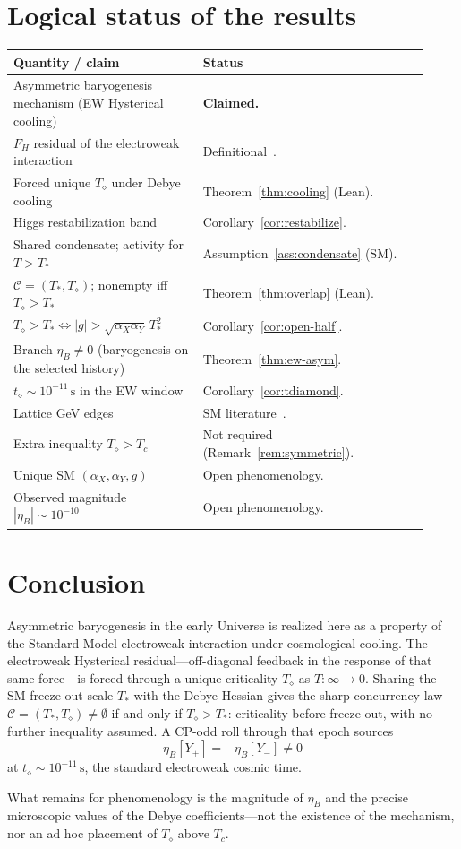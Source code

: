 \documentclass[11pt]{article}
\theoremstyle{definition}
\theoremstyle{remark}
\newcommand{\Td}{T_{\diamond}}
\begin{document}
\section{Logical status of the results}
\label{sec:status}
\begin{center}
\small
\begin{tabular}{@{}p{0.42\linewidth}p{0.50\linewidth}@{}}
\toprule
\textbf{Quantity / claim} & \textbf{Status}\\
\midrule
Asymmetric baryogenesis mechanism (EW Hysterical cooling) & \textbf{Claimed.}\\
$F_H$ residual of the electroweak interaction & Definitional~\cite{boyd2026response}.\\
Forced unique $\Td$ under Debye cooling & Theorem~\ref{thm:cooling} (Lean).\\
Higgs restabilization band & Corollary~\ref{cor:restabilize}.\\
Shared condensate; activity for $T>T_*$ & Assumption~\ref{ass:condensate} (SM).\\
$\mathcal C=(T_*,\Td)$; nonempty iff $\Td>T_*$ & Theorem~\ref{thm:overlap} (Lean).\\
$\Td>T_*\Leftrightarrow|g|>\sqrt{\alpha_X\alpha_Y}\,T_*^{2}$ & Corollary~\ref{cor:open-half}.\\
Branch $\eta_B\neq0$ (baryogenesis on the selected history) & Theorem~\ref{thm:ew-asym}.\\
$t_\diamond\sim10^{-11}\,\mathrm{s}$ in the EW window & Corollary~\ref{cor:tdiamond}.\\
Lattice GeV edges & SM literature~\cite{DOnofrio2014}.\\
Extra inequality $\Td>T_c$ & Not required (Remark~\ref{rem:symmetric}).\\
Unique SM $(\alpha_X,\alpha_Y,g)$ & Open phenomenology.\\
Observed magnitude $|\eta_B|\sim10^{-10}$ & Open phenomenology.\\
\bottomrule
\end{tabular}
\end{center}

\section{Conclusion}
\label{sec:conclusion}
Asymmetric baryogenesis in the early Universe is realized here as a property of
the Standard Model electroweak interaction under cosmological cooling.
The electroweak Hysterical residual---off-diagonal feedback in the response of
that same force---is forced through a unique criticality $\Td$ as $T:\infty\to0$.
Sharing the SM freeze-out scale $T_*$ with the Debye Hessian gives the sharp
concurrency law $\mathcal C=(T_*,\Td)\neq\emptyset$ if and only if $\Td>T_*$:
criticality before freeze-out, with no further inequality assumed.
A CP-odd roll through that epoch sources
\begin{equation}
\eta_B[Y_+]=-\eta_B[Y_-]\neq0
\end{equation}
at $t_\diamond\sim10^{-11}\,\mathrm{s}$, the standard electroweak cosmic time.

What remains for phenomenology is the magnitude of $\eta_B$ and the precise
microscopic values of the Debye coefficients---not the existence of the mechanism,
nor an ad hoc placement of $\Td$ above $T_c$.



\end{document}
